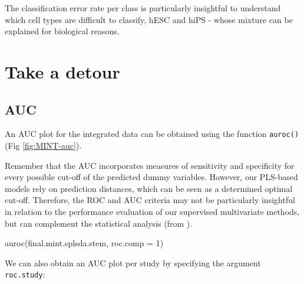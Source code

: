 \documentclass[
]{book}
\newenvironment{Shaded}{\begin{snugshade}}{\end{snugshade}}
\newcommand{\AttributeTok}[1]{\textcolor[rgb]{0.77,0.63,0.00}{#1}}
\newcommand{\CommentTok}[1]{\textcolor[rgb]{0.56,0.35,0.01}{\textit{#1}}}
\newcommand{\DecValTok}[1]{\textcolor[rgb]{0.00,0.00,0.81}{#1}}
\newcommand{\FunctionTok}[1]{\textcolor[rgb]{0.00,0.00,0.00}{#1}}
\newcommand{\NormalTok}[1]{#1}
\newcommand{\OtherTok}[1]{\textcolor[rgb]{0.56,0.35,0.01}{#1}}
\newcommand{\SpecialCharTok}[1]{\textcolor[rgb]{0.00,0.00,0.00}{#1}}
\newcommand{\StringTok}[1]{\textcolor[rgb]{0.31,0.60,0.02}{#1}}
\begin{document}
\begin{Shaded}
\end{Shaded}

The classification error rate per class is particularly insightful to understand which cell types are difficult to classify, hESC and hiPS - whose mixture can be explained for biological reasons.

\hypertarget{mint:detour}{%
\section{Take a detour}\label{mint:detour}}

\hypertarget{auc}{%
\subsection{AUC}\label{auc}}

An AUC plot for the integrated data can be obtained using the function \texttt{auroc()} (Fig \ref{fig:MINT-auc}).

Remember that the AUC incorporates measures of sensitivity and specificity for every possible cut-off of the predicted dummy variables. However, our PLS-based models rely on prediction distances, which can be seen as a determined optimal cut-off. Therefore, the ROC and AUC criteria may not be particularly insightful in relation to the performance evaluation of our supervised multivariate methods, but can complement the statistical analysis (from \citet{Roh17}).

\begin{Shaded}
\begin{Highlighting}[]
\FunctionTok{auroc}\NormalTok{(final.mint.splsda.stem, }\AttributeTok{roc.comp =} \DecValTok{1}\NormalTok{)}
\end{Highlighting}
\end{Shaded}

We can also obtain an AUC plot per study by specifying the argument \texttt{roc.study}:
\end{document}

